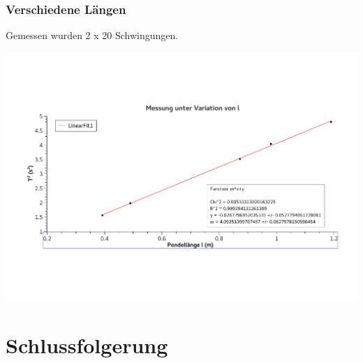 \documentclass[
	a4paper,
	12pt,
	pagesize,
	ngerman
]{scrartcl}
\begin{document}
	\newpage
	\subsubsection{Verschiedene Längen}
	Gemessen wurden 2 x 20 Schwingungen.


	\includegraphics[width=1\textwidth]{Graph}



	\newpage
	\section{Schlussfolgerung}

	
\end{document}
